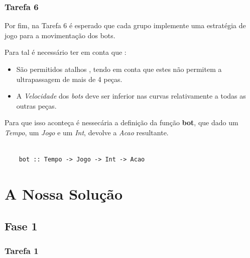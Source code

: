 \documentclass[a4paper]{report} %
\begin{document}
\subsection{Tarefa 6}
Por fim, na Tarefa 6 é esperado que cada grupo implemente uma estratégia de  jogo para a movimentação dos bots.
    
    Para tal é necessário ter em conta que :
\begin{itemize}
    
    \item São permitidos atalhos , tendo em conta que estes não permitem a ultrapassagem de mais de 4 peças.
    \item A \emph{Velocidade} dos \textit{bots} deve ser inferior nas curvas relativamente a todas as outras peças.

\end{itemize}

Para que isso aconteça é nessecária a definição da função \textbf{bot}, que dado um \emph{Tempo}, um \emph{Jogo} e um \emph{Int}, devolve a \emph{Acao} resultante.

\begin{verbatim} 
    
    bot :: Tempo -> Jogo -> Int -> Acao

\end{verbatim}

\chapter{A Nossa Solução}
\label{sec:solucao}

\section {Fase 1}
\subsection {Tarefa 1}
\end{document}
